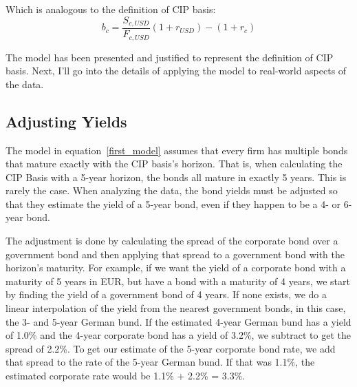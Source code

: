 

\noindent Which is analogous to the definition of CIP basis:
\begin{equation}
 b_{c} = \frac{S_{c,USD}}{F_{c,USD}}(1 + r_{USD}) - (1 + r_{c}) 
\end{equation}


The model has been presented and justified to represent the definition of CIP basis.  Next, I'll go into the details of applying the model to real-world aspects of the data.

\subsection{Adjusting Yields} \label{adjusting_yields} 


The model in equation~\eqref{first_model} assumes that every firm has multiple bonds that mature exactly with the CIP basis's horizon.  That is, when calculating the CIP Basis with a 5-year horizon, the bonds all mature in exactly 5 years.  This is rarely the case.  When analyzing the data, the bond yields must be adjusted so that they estimate the yield of a 5-year bond, even if they happen to be a 4- or 6-year bond.

The adjustment is done by calculating the spread of the corporate bond over a government bond and then applying that spread to a government bond with the horizon's maturity.  For example, if we want the yield of a corporate bond with a maturity of 5 years in EUR, but have a bond with a maturity of 4 years, we start by finding the yield of a government bond of 4 years.  If none exists, we do a linear interpolation of the yield from the nearest government bonds, in this case, the 3- and 5-year German bund.  If the estimated 4-year German bund has a yield of 1.0\% and the 4-year corporate bond has a yield of 3.2\%, we subtract to get the spread of 2.2\%.   To get our estimate of the 5-year corporate bond rate, we add that spread to the rate of the 5-year German bund.  If that was 1.1\%, the estimated corporate rate would be 1.1\% + 2.2\% = 3.3\%.  

